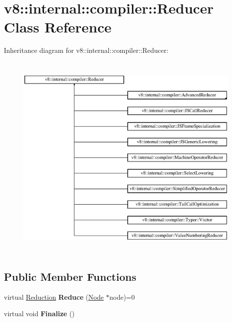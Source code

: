 \hypertarget{classv8_1_1internal_1_1compiler_1_1_reducer}{}\section{v8\+:\+:internal\+:\+:compiler\+:\+:Reducer Class Reference}
\label{classv8_1_1internal_1_1compiler_1_1_reducer}
Inheritance diagram for v8\+:\+:internal\+:\+:compiler\+:\+:Reducer\+:\begin{figure}[H]
\begin{center}
\leavevmode
\includegraphics[height=10.440678cm]{classv8_1_1internal_1_1compiler_1_1_reducer}
\end{center}
\end{figure}
\subsection*{Public Member Functions}
\begin{DoxyCompactItemize}
\item 
virtual \hyperlink{classv8_1_1internal_1_1compiler_1_1_reduction}{Reduction} {\bfseries Reduce} (\hyperlink{classv8_1_1internal_1_1compiler_1_1_node}{Node} $\ast$node)=0\hypertarget{classv8_1_1internal_1_1compiler_1_1_reducer_acc15b2ec184dc342fb3e7d77488952ff}{}\label{classv8_1_1internal_1_1compiler_1_1_reducer_acc15b2ec184dc342fb3e7d77488952ff}

\item 
virtual void {\bfseries Finalize} ()\hypertarget{classv8_1_1internal_1_1compiler_1_1_reducer_ac513c56f978be7f058b9894d24a0a3c7}{}\label{classv8_1_1internal_1_1compiler_1_1_reducer_ac513c56f978be7f058b9894d24a0a3c7}

\end{DoxyCompactItemize}

